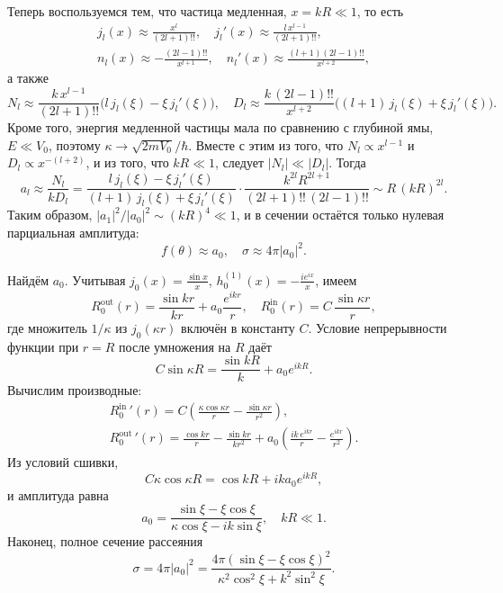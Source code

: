 Теперь воспользуемся тем, что частица медленная, $x = kR\ll1$, то есть
\begin{gather*}
  j_l(x)\approx\frac{x^l}{(2l+1)!!}, \quad j_l'(x)\approx\frac{l\,x^{l-1}}{(2l+1)!!}, \\
  n_l(x)\approx-\frac{(2l-1)!!}{x^{l+1}}, \quad n_l'(x)\approx\frac{(l+1)(2l-1)!!}{x^{l+2}},
\end{gather*}
а также
\[
  N_l\approx\frac{k\,x^{l-1}}{(2l+1)!!}\big(l\,j_l(\xi)-\xi\, j_l'(\xi)\big), \quad D_l\approx\frac{k\,(2l-1)!!}{x^{l+2}}\big((l+1)\,j_l(\xi)+\xi\, j_l'(\xi)\big).
\]
Кроме того, энергия медленной частицы мала по сравнению с глубиной ямы, $E\ll
  V_0$, поэтому $\kappa\to\sqrt{2mV_0}/\hbar$. Вместе с этим из того, что $N_l
  \propto x^{l-1}$ и $D_l \propto x^{-(l+2)}$, и из того, что $kR \ll 1$, следует
$|N_l|\ll|D_l|$. Тогда
\[
  a_l\approx\frac{N_l}{kD_l} = \frac{l\,j_l(\xi)-\xi\, j_l'(\xi)}{(l+1)\,j_l(\xi)+\xi\, j_l'(\xi)}\cdot\frac{k^{2l}R^{2l+1}}{(2l+1)!!\,(2l-1)!!}\sim R\,(kR)^{2l}.
\]
Таким образом, $|a_1|^2/|a_0|^2\sim(kR)^4\ll1$, и в сечении остаётся только
нулевая парциальная амплитуда:
\[
  f(\theta)\approx a_0, \quad \sigma\approx4\pi|a_0|^2.
\]

Найдём $a_0$. Учитывая $j_0(x) = \frac{\sin x}{x}$, $h_0^{(1)}(x) =
  -\frac{ie^{ix}}{x}$, имеем
\[
  R_0^{\text{out}}(r) = \frac{\sin kr}{kr}+a_0\frac{e^{ikr}}{r}, \quad R_0^{\text{in}}(r) = C\,\frac{\sin\kappa r}{r},
\]
где множитель $1/\kappa$ из $j_0(\kappa r)$ включён в константу $C$. Условие
непрерывности функции при $r=R$ после умножения на $R$ даёт
\[
  C\sin\kappa R = \frac{\sin kR}{k}+a_0e^{ikR}.
\]
Вычислим производные:
\begin{gather*}
  R_0^{\text{in}}\,'(r) = C\left(\frac{\kappa\cos\kappa r}{r}-\frac{\sin\kappa r}{r^2}\right), \\
  R_0^{\text{out}}\,'(r) = \frac{\cos kr}{r}-\frac{\sin kr}{kr^2}+a_0\left(\frac{ik\,e^{ikr}}{r}-\frac{e^{ikr}}{r^2}\right).
\end{gather*}
Из условий сшивки,
\[
  C\kappa\cos\kappa R = \cos kR+ika_0e^{ikR},
\]
и амплитуда равна
\[
  a_0 = \frac{\sin\xi-\xi\cos\xi}{\kappa\cos\xi-ik\sin\xi}, \quad kR\ll1.
\]
Наконец, полное сечение рассеяния
\[
  \sigma = 4\pi|a_0|^2 = \frac{4\pi\left(\sin\xi-\xi\cos\xi\right)^2}{\kappa^2\cos^2\xi+k^2\sin^2\xi}.
\]

